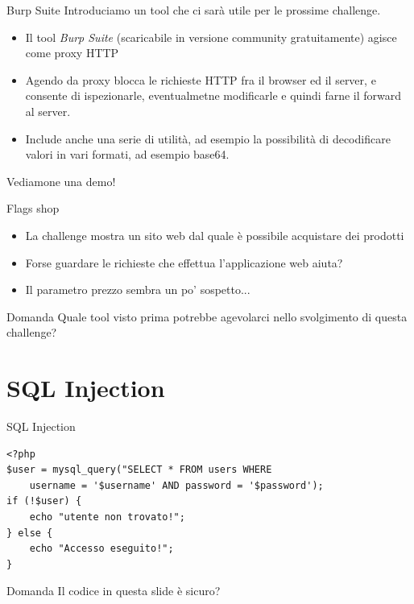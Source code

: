 \documentclass[12pt]{beamer}
\begin{document}
\begin{frame}{Burp Suite}
    Introduciamo un tool che ci sarà utile per le prossime challenge. 
    \vfill
\begin{itemize}
    \item Il tool \textit{Burp Suite} (scaricabile in versione community gratuitamente) agisce 
        come proxy HTTP
    \item Agendo da proxy blocca le richieste HTTP fra il browser ed il server, e consente di ispezionarle, eventualmetne modificarle e quindi farne il forward al server.
    \item Include anche una serie di utilità, ad esempio la possibilità di decodificare valori in vari formati, ad esempio base64.
\end{itemize}
    \vfill
    Vediamone una demo!
\end{frame}

\begin{frame}{Flags shop}
    \begin{itemize}
        \item La challenge mostra un sito web dal quale è possibile acquistare dei prodotti
        \pause
        \item Forse guardare le richieste che effettua l'applicazione web aiuta?
        \pause
        \item Il parametro prezzo sembra un po' sospetto... 
    \end{itemize}

    \begin{exampleblock}{Domanda}
        Quale tool visto prima potrebbe agevolarci nello svolgimento di questa challenge?
    \end{exampleblock}
\end{frame}


\section{SQL Injection}
\begin{frame}[fragile]{SQL Injection}
\begin{verbatim}
<?php
$user = mysql_query("SELECT * FROM users WHERE 
    username = '$username' AND password = '$password');
if (!$user) {
    echo "utente non trovato!";
} else {
    echo "Accesso eseguito!";
}
\end{verbatim}
\vfill
\begin{exampleblock}{Domanda}
    Il codice in questa slide è sicuro?
\end{exampleblock}
\end{frame}
\end{document}
